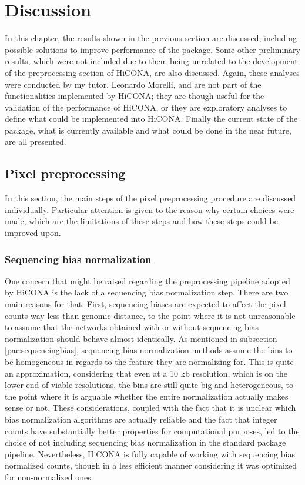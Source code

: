 \graphicspath{{chapters/06_discussion/images}}
\chapter{Discussion}

In this chapter, the results shown in the previous section are discussed, including possible solutions to improve  performance of the package. Some other preliminary results, which were not included due to them being unrelated to the development of the preprocessing section of HiCONA, are also discussed. Again, these analyses were conducted by my tutor, Leonardo Morelli, and are not part of the functionalities implemented by HiCONA; they are though useful for the validation of the performance of HiCONA, or they are exploratory analyses to define what could be implemented into HiCONA. Finally the current state of the package, what is currently available and what could be done in the near future, are all presented.


\section{Pixel preprocessing}
In this section, the main steps of the pixel preprocessing procedure are discussed individually. Particular attention is given to the reason why certain choices were made, which are the limitations of these steps and how these steps could be improved upon.

\subsection{Sequencing bias normalization}
One concern that might be raised regarding the preprocessing pipeline adopted by HiCONA is the lack of a sequencing bias normalization step. There are two main reasons for that. First, sequencing biases are expected to affect the pixel counts way less than genomic distance, to the point where it is not unreasonable to assume that the networks obtained with or without sequencing bias normalization should behave almost identically. As mentioned in subsection \ref{par:sequencingbias}, sequencing bias normalization methods assume the bins to be homogeneous in regards to the feature they are normalizing for. This is quite an approximation, considering that even at a 10 kb resolution, which is on the lower end of viable resolutions, the bins are still quite big and heterogeneous, to the point where it is arguable whether the entire normalization actually makes sense or not. These considerations, coupled with the fact that it is unclear which bias normalization algorithms are actually reliable and the fact that integer counts have substantially better properties for computational purposes, led to the choice of not including sequencing bias normalization in the standard package pipeline. Nevertheless, 
HiCONA is fully capable of working with sequencing bias normalized counts, though in a less efficient manner considering it was optimized for non-normalized ones.


